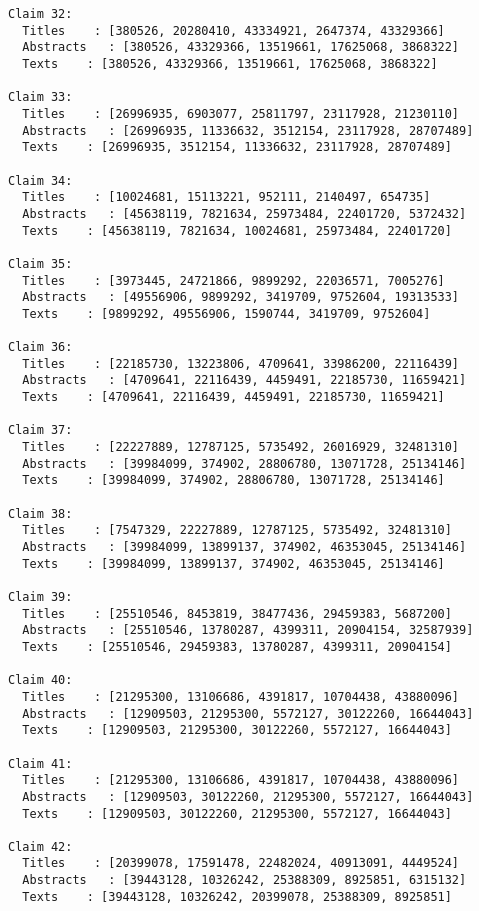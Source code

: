 \documentclass[11pt]{article}
\begin{document}
\begin{Verbatim}[commandchars=\\\{\}]
Claim 32:
  Titles    : [380526, 20280410, 43334921, 2647374, 43329366]
  Abstracts   : [380526, 43329366, 13519661, 17625068, 3868322]
  Texts    : [380526, 43329366, 13519661, 17625068, 3868322]

Claim 33:
  Titles    : [26996935, 6903077, 25811797, 23117928, 21230110]
  Abstracts   : [26996935, 11336632, 3512154, 23117928, 28707489]
  Texts    : [26996935, 3512154, 11336632, 23117928, 28707489]

Claim 34:
  Titles    : [10024681, 15113221, 952111, 2140497, 654735]
  Abstracts   : [45638119, 7821634, 25973484, 22401720, 5372432]
  Texts    : [45638119, 7821634, 10024681, 25973484, 22401720]

Claim 35:
  Titles    : [3973445, 24721866, 9899292, 22036571, 7005276]
  Abstracts   : [49556906, 9899292, 3419709, 9752604, 19313533]
  Texts    : [9899292, 49556906, 1590744, 3419709, 9752604]

Claim 36:
  Titles    : [22185730, 13223806, 4709641, 33986200, 22116439]
  Abstracts   : [4709641, 22116439, 4459491, 22185730, 11659421]
  Texts    : [4709641, 22116439, 4459491, 22185730, 11659421]

Claim 37:
  Titles    : [22227889, 12787125, 5735492, 26016929, 32481310]
  Abstracts   : [39984099, 374902, 28806780, 13071728, 25134146]
  Texts    : [39984099, 374902, 28806780, 13071728, 25134146]

Claim 38:
  Titles    : [7547329, 22227889, 12787125, 5735492, 32481310]
  Abstracts   : [39984099, 13899137, 374902, 46353045, 25134146]
  Texts    : [39984099, 13899137, 374902, 46353045, 25134146]

Claim 39:
  Titles    : [25510546, 8453819, 38477436, 29459383, 5687200]
  Abstracts   : [25510546, 13780287, 4399311, 20904154, 32587939]
  Texts    : [25510546, 29459383, 13780287, 4399311, 20904154]

Claim 40:
  Titles    : [21295300, 13106686, 4391817, 10704438, 43880096]
  Abstracts   : [12909503, 21295300, 5572127, 30122260, 16644043]
  Texts    : [12909503, 21295300, 30122260, 5572127, 16644043]

Claim 41:
  Titles    : [21295300, 13106686, 4391817, 10704438, 43880096]
  Abstracts   : [12909503, 30122260, 21295300, 5572127, 16644043]
  Texts    : [12909503, 30122260, 21295300, 5572127, 16644043]

Claim 42:
  Titles    : [20399078, 17591478, 22482024, 40913091, 4449524]
  Abstracts   : [39443128, 10326242, 25388309, 8925851, 6315132]
  Texts    : [39443128, 10326242, 20399078, 25388309, 8925851]


\end{Verbatim}
\end{document}
